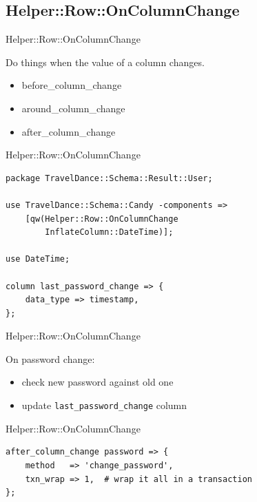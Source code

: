 \subsection{Helper::Row::OnColumnChange}

\begin{frame}[fragile]{Helper::Row::OnColumnChange}

Do things when the value of a column changes.

\begin{itemize}
\item before\_column\_change
\item around\_column\_change
\item after\_column\_change
\end{itemize}

\end{frame}

\begin{frame}[fragile]{Helper::Row::OnColumnChange}

\begin{lstlisting}
package TravelDance::Schema::Result::User;

use TravelDance::Schema::Candy -components =>
    [qw(Helper::Row::OnColumnChange 
        InflateColumn::DateTime)];

use DateTime;

column last_password_change => {
    data_type => timestamp,
};
\end{lstlisting}
\end{frame}

\begin{frame}[fragile]{Helper::Row::OnColumnChange}

On password change:

\begin{itemize}
\item check new password against old one
\item update \verb|last_password_change| column
\end{itemize}

\end{frame}

\begin{frame}[fragile]{Helper::Row::OnColumnChange}
\begin{lstlisting}
after_column_change password => {
    method   => 'change_password',
    txn_wrap => 1,  # wrap it all in a transaction
};
\end{lstlisting}
\end{frame}

